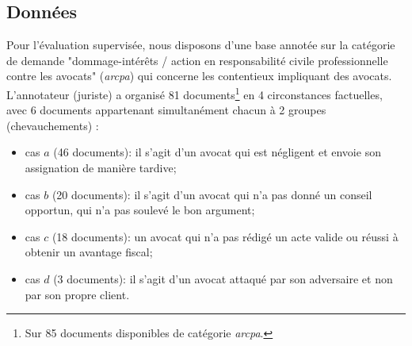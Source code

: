 \subsection{Données}
\label{sec:similarite:données}
Pour l'évaluation supervisée, nous disposons d'une base annotée sur la catégorie de demande "dommage-intérêts / action en responsabilité civile professionnelle contre les avocats" (\textit{arcpa}) qui concerne les contentieux impliquant des avocats.  L'annotateur (juriste) a organisé 81 documents\footnote{Sur 85 documents disponibles de catégorie \textit{arcpa}.} en 4 circonstances factuelles, avec 6 documents appartenant simultanément chacun à 2 groupes (chevauchements) :
\begin{itemize}
\item cas $a$ (46 documents): il s'agit d'un avocat qui est négligent et envoie son assignation de manière tardive; %
\item cas $b$ (20 documents): il s'agit d'un avocat qui n'a pas donné un conseil opportun, qui n'a pas soulevé le bon argument;
\item cas $c$ (18 documents): un avocat qui n'a pas rédigé un acte valide ou réussi à obtenir un avantage fiscal; %
\item cas $d$ (3 documents): il s'agit d'un avocat attaqué par son adversaire et non par son propre client.
\end{itemize}



